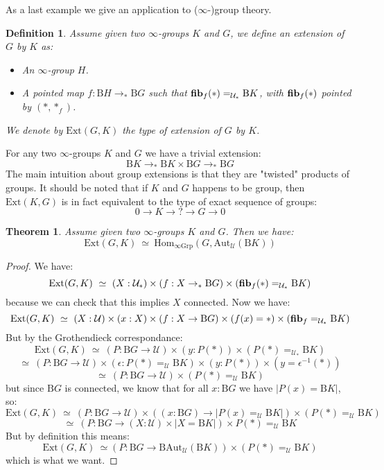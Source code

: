 \documentclass{article}
\newcommand{\U}{{\mathcal U}}
\renewcommand{\r}{\rightarrow}
\newcommand{\fib}{\mathrm{\bf fib}}
\newcommand{\Grp}{\mathrm{Grp}}
\newcommand{\Hom}{\mathrm{Hom}}
\newcommand{\B}{\mathrm{B}}
\newcommand{\Aut}{\mathrm{Aut}}
\newtheorem{definition}{Definition}
\newtheorem{theorem}{Theorem}
\begin{document}
As a last example we give an application to ($\infty$-)group theory.

\begin{definition}
Assume given two $\infty$-groups $K$ and $G$, we define an extension of $G$ by $K$ as:
\begin{itemize}
\item An $\infty$-group $H$.
\item A pointed map $f : \B H \r_* \B G$ such that $\fib_f(*) =_{\U_*} \B K$, with $\fib_f(*)$ pointed by $(*,*_f)$.
\end{itemize}
We denote by $\mathrm{Ext}(G,K)$ the type of extension of $G$ by $K$.
\end{definition}

For any two $\infty$-groups $K$ and $G$ we have a trivial extension:
\[\B K\r_* \B K\times\B G\r_*\B G\]
The main intuition about group extensions is that they are "twisted" products of groups. %
It should be noted that if $K$ and $G$ happens to be group, then $\mathrm{Ext}(K,G)$ is in fact equivalent to the type of exact sequence of groups:
\[0\r K\r ?\r G\r 0\]


\begin{theorem}
Assume given two $\infty$-groups $K$ and $G$. Then we have:
\[\mathrm{Ext}(G,K)\ \simeq \ \Hom_{\infty\Grp}(G,\Aut_\U(\B K))\]
\end{theorem}
\begin{proof}
We have:
\[\mathrm{Ext}(G,K) \ \simeq\ (X:\U_*) \times (f:X\r_* \B G) \times (\fib_f(*)=_{\U_*} \B K) \]
because we can check that this implies $X$ connected. Now we have:
\[\mathrm{Ext}(G,K) \ \simeq \ (X:\U)\times (x:X)\times (f:X\r \B G)\times (f(x)=*) \times  (\fib_f=_{\U_*} \B K) \]
But by the Grothendieck correspondance:
\[\mathrm{Ext}(G,K) \ \simeq\ (P : \B G \r \U) \times (y:P(*))\times (P(*) =_{\U_*} \B K) \]
\[\simeq \ (P : \B G \r \U)\times (\epsilon : P(*) =_\U \B K) \times (y:P(*)) \times (y= \epsilon^{-1}(*))\]
\[\simeq\ (P:\B G \r \U) \times (P(*) =_\U \B K)\]
but since $\B G$ is connected, we know that for all $x:\B G$ we have $|P(x) = \B K|$, so:
\[\mathrm{Ext}(G,K) \ \simeq\ (P:\B G \r \U)\times ((x:\B G)\r |P(x) =_\U \B K|) \times (P(*) =_\U \B K)\]
\[\simeq\  (P:\B G\r (X:\U)\times | X= \B K|)\times P(*) =_\U \B K\]
But by definition this means:
\[\mathrm{Ext}(G,K) \ \simeq (P:\B G\r \B\Aut_\U(\B K))\times (P(*) =_\U \B K)\]
which is what we want.
\end{proof}
\end{document}
